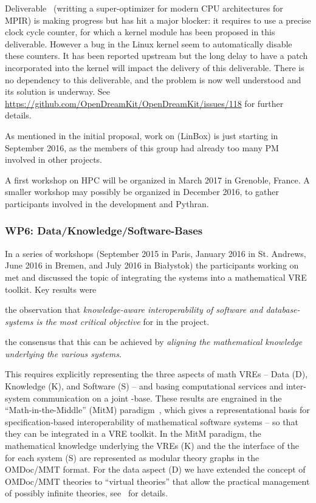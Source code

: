\documentclass{deliverablereport}
\begin{document}
Deliverable~ (writting a super-optimizer for modern CPU
architectures for MPIR) is making progress but has hit a major blocker: it
requires to use a precise clock cycle counter, for which a kernel module has been
proposed in this deliverable. However a bug in the Linux kernel seem to
automatically disable these counters. It has been reported upstream but the long
delay to have a patch incorporated into the kernel will impact the delivery of
this deliverable. There is no dependency to this deliverable, and the problem is
now well understood and its solution is underway. See
\url{https://github.com/OpenDreamKit/OpenDreamKit/issues/118} for further details.

As mentioned in the initial proposal, work on  (LinBox) is just
starting in September 2016, as the members of this group had already too many PM
involved in other projects.

A first workshop on HPC will be organized in March 2017 in Grenoble, France. A
smaller workshop may possibly be organized in December 2016, to gather
participants involved in the development and Pythran.


\subsubsection{WP6: Data/Knowledge/Software-Bases }

In a series of workshops (September 2015 in Paris, January 2016 in St. Andrews, June 2016
in Bremen, and July 2016 in Bia{\l}ystok) the participants working on  met
and discussed the topic of integrating the \pn systems into a mathematical VRE toolkit.
Key results were
\begin{compactitem}[\bf D1.]
\item the observation that \emph{knowledge-aware interoperability of software and
    database-systems is the most critical objective} for  in the \pn
  project.
\item the consensus that this can be achieved by \emph{aligning the mathematical knowledge
    underlying the various systems}.
\end{compactitem}
This requires explicitly representing the three aspects of math VREs -- Data (D),
Knowledge (K), and Software (S) -- and basing computational services and inter-system
communication on a joint \DKS-base. These results are engrained in the
``Math-in-the-Middle'' (MitM) paradigm~\cite{DehKohKon:iop16}, which gives a
representational basis for specification-based interoperability of mathematical software
systems -- so that they can be integrated in a VRE toolkit. In the MitM paradigm, the
mathematical knowledge underlying the VREs (K) and the the interface of the for each
system (S) are represented as modular theory graphs in the OMDoc/MMT format. For the data
aspect (D) we have extended the concept of OMDoc/MMT theories to ``virtual theories'' that
allow the practical management of possibly infinite theories, see~\cite{ODK-D6.2} for
details. 
\end{document}
